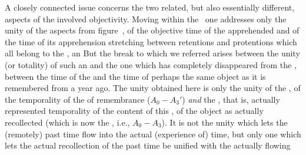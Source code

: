 A closely connected issue concerns the two related, but also essentially
different, aspects of the involved objectivity.  Moving within the \hoa\ one
addresses only the unity of the aspects from figure~, of the
objective time of the  apprehended  and of the time of
its apprehension stretching between retentions and protentions which all belong
to the , an   But
the break to which we 
referred arises between the unity (or totality) of such an 
and the one which has completely disappeared from the \hoa, between the time of the
 and the time of perhaps the same object as it is remembered from a year
ago.  The unity obtained here is only the unity of the ,
of the temporality of the  of remembrance ($A_0-A_3'$) {\em and} the
, that is, actually represented temporality of the content of this
, of the object as actually recollected (which is now the , i.e., $A_0-A_3$). It is not the unity which lets the (remotely) past
time flow into the actual (experience of) time, but only one which lets the
actual recollection of the past time be unified with the actually flowing
